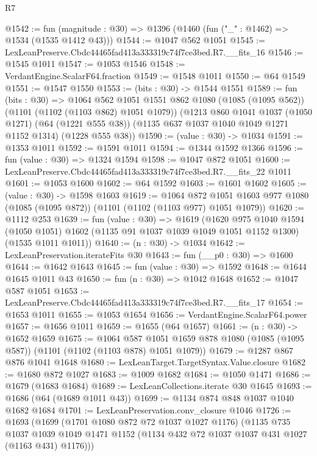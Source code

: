 \begin{lexlean}{R7}
\begin{coremodule}
@1542 := fun (magnitude : @30) => @1396 (@1460 (fun ("_" : @1462) => @1534 (@1535 @1412 @43)))
@1544 := @1047 @562 @1051
@1545 := LexLeanPreserve.Cbdc44465fad413a333319c74f7ce3bed.R7.__fits_16
@1546 := @1545 @1011
@1547 := @1053 @1546
@1548 := VerdantEngine.ScalarF64.fraction
@1549 := @1548 @1011
@1550 := @64 @1549
@1551 := @1547 @1550
@1553 := (bits : @30) -> @1544 @1551
@1589 := fun (bits : @30) =>
  @1064
    @562
    @1051
    @1551
    @862
    @1080
    (@1085 (@1095 @562))
    (@1101 (@1102 (@1103 @862) @1051 @1079))
    (@1213
      @860
      @1041
      @1037
      (@1050 @1271)
      (@64 (@1221 @555 @38))
      (@1135 @637 @1037 @1040 @1049 @1271 @1152 @1314)
      (@1228 @555 @38))
@1590 := (value : @30) -> @1034
@1591 := @1353 @1011
@1592 := @1591 @1011
@1594 := @1344 @1592 @1366
@1596 := fun (value : @30) => @1324 @1594
@1598 := @1047 @872 @1051
@1600 := LexLeanPreserve.Cbdc44465fad413a333319c74f7ce3bed.R7.__fits_22 @1011
@1601 := @1053 @1600
@1602 := @64 @1592
@1603 := @1601 @1602
@1605 := (value : @30) -> @1598 @1603
@1619 := @1064
    @872
    @1051
    @1603
    @977
    @1080
    (@1085 (@1095 @872))
    (@1101 (@1102 (@1103 @977) @1051 @1079))
@1620 := @1112 @253
@1639 := fun (value : @30) =>
  @1619
    (@1620
      @975
      @1040
      @1594
      (@1050 @1051)
      @1602
      (@1135 @91 @1037 @1039 @1049 @1051 @1152 @1300)
      (@1535 @1011 @1011))
@1640 := (n : @30) -> @1034
@1642 := LexLeanPreservation.iterateFits @30
@1643 := fun (__p0 : @30) => @1600
@1644 := @1642 @1643
@1645 := fun (value : @30) => @1592
@1648 := @1644 @1645 @1011 @43
@1650 := fun (n : @30) => @1042 @1648
@1652 := @1047 @587 @1051
@1653 := LexLeanPreserve.Cbdc44465fad413a333319c74f7ce3bed.R7.__fits_17
@1654 := @1653 @1011
@1655 := @1053 @1654
@1656 := VerdantEngine.ScalarF64.power
@1657 := @1656 @1011
@1659 := @1655 (@64 @1657)
@1661 := (n : @30) -> @1652 @1659
@1675 := @1064
    @587
    @1051
    @1659
    @878
    @1080
    (@1085 (@1095 @587))
    (@1101 (@1102 (@1103 @878) @1051 @1079))
@1679 := @1287 @867 @876 @1041 @1648
@1680 := LexLeanTarget.TargetSyntax.Value.closure
@1682 := @1680 @872 @1027
@1683 := @1009 @1682
@1684 := @1050 @1471
@1686 := @1679 (@1683 @1684)
@1689 := LexLeanCollections.iterate @30 @1645
@1693 := @1686 (@64 (@1689 @1011 @43))
@1699 := @1134 @874 @848 @1037 @1040 @1682 @1684
@1701 := LexLeanPreservation.conv_closure @1046
@1726 := @1693
    (@1699
      (@1701 @1080 @872 @72 @1037 @1027 @1176)
      (@1135
        @735
        @1037
        @1039
        @1049
        @1471
        @1152
        (@1134 @432 @72 @1037 @1037 @431 @1027 (@1163 @431) @1176)))

\end{coremodule}
\end{lexlean}
